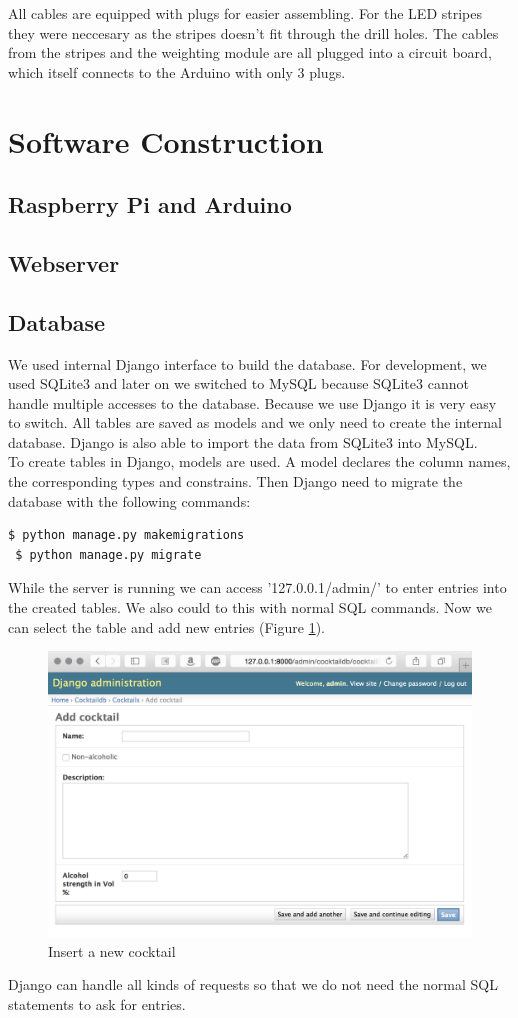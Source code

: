 \documentclass{acm_proc_article-sp}
\begin{document}
All cables are equipped with plugs for easier assembling. For the LED stripes they were neccesary as the stripes doesn't fit through the drill holes. The cables from the stripes and the weighting module are all plugged into a circuit board, which itself connects to the Arduino with only 3 plugs. 

\section{Software Construction}
\subsection{Raspberry Pi and Arduino}
\subsection{Webserver}\label{sec:webserver}

\subsection{Database}
We used internal Django interface to build the database. For development, we used SQLite3 and later on we switched to MySQL because SQLite3 cannot handle multiple accesses to the database. Because we use Django it is very easy to switch. All tables are saved as models and we only need to create the internal database. Django is also able to import the data from SQLite3 into MySQL. \\
To create tables in Django, models are used. A model declares the column names, the corresponding types and constrains. Then Django need to migrate the database with the following commands:
\begin{lstlisting}[language=bash]
 $ python manage.py makemigrations
 $ python manage.py migrate
\end{lstlisting}
While the server is running we can access '127.0.0.1/admin/' to enter entries into the created tables. We also could to this with normal SQL commands. Now we can select the table and add new entries (Figure \ref{fig:db_entry}). \\
\begin{figure}[htbp] 
 \centering
    \includegraphics[width=0.7\linewidth]{pictures/db_insert_entry.png}
 \caption{Insert a new cocktail}
 \label{fig:db_entry}
\end{figure}
Django can handle all kinds of requests so that we do not need the normal SQL statements to ask for entries.
\end{document}
